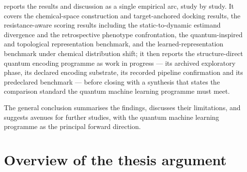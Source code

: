  reports the results and discussion as a single empirical arc, study by study. It covers the chemical-space construction and target-anchored docking results, the resistance-aware scoring results including the static-to-dynamic estimand divergence and the retrospective phenotype confrontation, the quantum-inspired and topological representation benchmark, and the learned-representation benchmark under chemical distribution shift; it then reports the structure-direct quantum encoding programme as work in progress --- its archived exploratory phase, its declared encoding substrate, its recorded pipeline confirmation and its predeclared benchmark --- before closing with a synthesis that states the comparison standard the quantum machine learning programme must meet.

The general conclusion summarises the findings, discusses their limitations, and suggests avenues for further studies, with the quantum machine learning programme as the principal forward direction.

\section*{Overview of the thesis argument}

